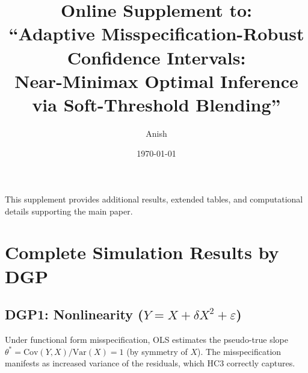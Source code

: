 \documentclass[12pt]{article}
\title{Online Supplement to:\\
``Adaptive Misspecification-Robust Confidence Intervals:\\
Near-Minimax Optimal Inference via Soft-Threshold Blending''}
\author{Anish}
\date{\today}
\theoremstyle{definition}
\theoremstyle{remark}
\begin{document}
\maketitle

\setcounter{section}{0}
\renewcommand{\thesection}{S\arabic{section}}
\renewcommand{\thetable}{S\arabic{table}}
\renewcommand{\thefigure}{S\arabic{figure}}
\renewcommand{\theequation}{S\arabic{equation}}
\renewcommand{\thetheorem}{S\arabic{theorem}}

This supplement provides additional results, extended tables, and computational details supporting the main paper.

\tableofcontents

\section{Complete Simulation Results by DGP}
\label{sec:supp_dgp}

\subsection{DGP1: Nonlinearity ($Y = X + \delta X^2 + \varepsilon$)}

Under functional form misspecification, OLS estimates the pseudo-true slope
$\theta^* = \text{Cov}(Y,X)/\text{Var}(X) = 1$ (by symmetry of $X$). The
misspecification manifests as increased variance of the residuals, which
HC3 correctly captures.
\end{document}
